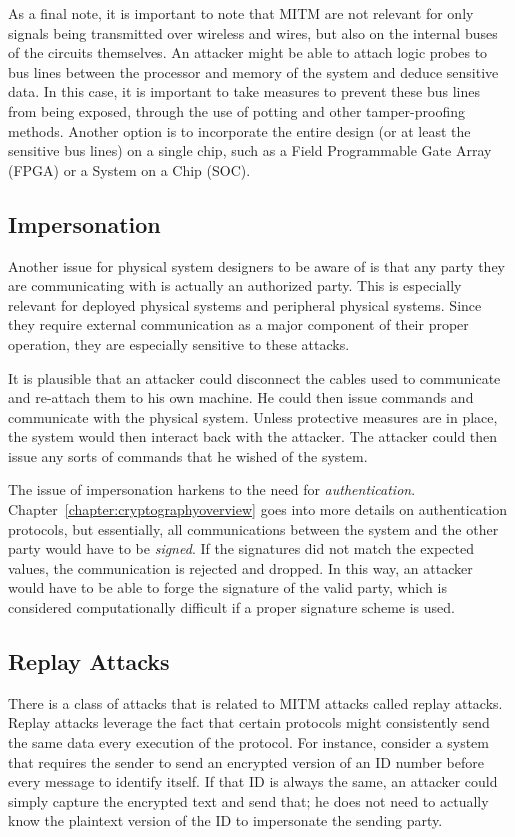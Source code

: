 As a final note, it is important to note that MITM are not relevant for only signals being transmitted over wireless and wires, but also on
the internal buses of the circuits themselves. An attacker might be able to attach logic probes to bus lines between the processor and memory
of the system and deduce sensitive data. In this case, it is important to take measures to prevent these bus lines from being exposed,
through the use of potting and other tamper-proofing methods. Another option is to incorporate the entire design (or at least the sensitive
bus lines) on a single chip, such as a Field Programmable Gate Array (FPGA) or a System on a Chip (SOC).

\subsection{Impersonation}
Another issue for physical system designers to be aware of is that any party they are communicating with is actually an authorized party.
This is especially relevant for deployed physical systems and peripheral physical systems. Since they require external communication as a
major component of their proper operation, they are especially sensitive to these attacks.

It is plausible that an attacker could disconnect the cables used to communicate and re-attach them to his own machine. He could then
issue commands and communicate with the physical system. Unless protective measures are in place, the system would then interact
back with the attacker. The attacker could then issue any sorts of commands that he wished of the system.

The issue of impersonation harkens to the need for \textit{authentication}. Chapter~\ref{chapter:cryptographyoverview} goes into more
details on authentication protocols, but essentially, all communications between the system and the other party would have to be
\textit{signed}. If the signatures did not match the expected values, the communication is rejected and dropped. In this way, an attacker
would have to be able to forge the signature of the valid party, which is considered computationally difficult if a proper signature scheme
is used.

\subsection{Replay Attacks}
There is a class of attacks that is related to MITM attacks called replay attacks. Replay attacks leverage the fact that certain protocols
might consistently send the same data every execution of the protocol. For instance, consider a system that requires the sender to 
send an encrypted version of an ID number
before every message to identify itself. If that ID is always the same, an attacker could simply capture the encrypted text and send
that; he does not need to actually know the plaintext version of the ID to impersonate the sending party.

